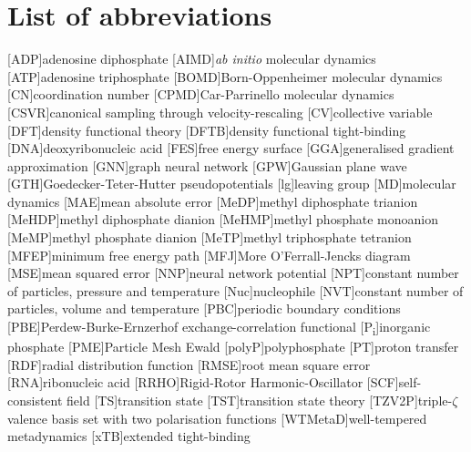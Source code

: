 \chapter*{List of abbreviations}

\begin{acronym}
    [ADP]{adenosine diphosphate}
    [AIMD]{\textit{ab initio} molecular dynamics}
    [ATP]{adenosine triphosphate}
    [BOMD]{Born-Oppenheimer molecular dynamics}
    [CN]{coordination number}
    [CPMD]{Car-Parrinello molecular dynamics}
    [CSVR]{canonical sampling through velocity-rescaling}
    [CV]{collective variable}
    [DFT]{density functional theory}
    [DFTB]{density functional tight-binding}
    [DNA]{deoxyribonucleic acid}
    [FES]{free energy surface}
    [GGA]{generalised gradient approximation}
    [GNN]{graph neural network}
    [GPW]{Gaussian plane wave}
    [GTH]{Goedecker-Teter-Hutter pseudopotentials}
    [lg]{leaving group}
    [MD]{molecular dynamics}
    [MAE]{mean absolute error}
    [MeDP]{methyl diphosphate trianion}
    [MeHDP]{methyl diphosphate dianion}
    [MeHMP]{methyl phosphate monoanion}
    [MeMP]{methyl phosphate dianion}
    [MeTP]{methyl triphosphate tetranion}
    [MFEP]{minimum free energy path}
    [MFJ]{More O'Ferrall-Jencks diagram}
    [MSE]{mean squared error}
    [NNP]{neural network potential}
    [NPT]{constant number of particles, pressure and temperature}
    [Nuc]{nucleophile}
    [NVT]{constant number of particles, volume and temperature}
    [PBC]{periodic boundary conditions}
    [PBE]{Perdew-Burke-Ernzerhof exchange-correlation functional}
    [P\textsubscript{i}]{inorganic phosphate}
    [PME]{Particle Mesh Ewald}
    [polyP]{polyphosphate}
    [PT]{proton transfer}
    [RDF]{radial distribution function}
    [RMSE]{root mean square error}
    [RNA]{ribonucleic acid}
    [RRHO]{Rigid-Rotor Harmonic-Oscillator}
    [SCF]{self-consistent field}
    [TS]{transition state}
    [TST]{transition state theory}
    [TZV2P]{triple-$\zeta$ valence basis set with two polarisation functions}
    [WTMetaD]{well-tempered metadynamics}
    [xTB]{extended tight-binding}
\end{acronym}